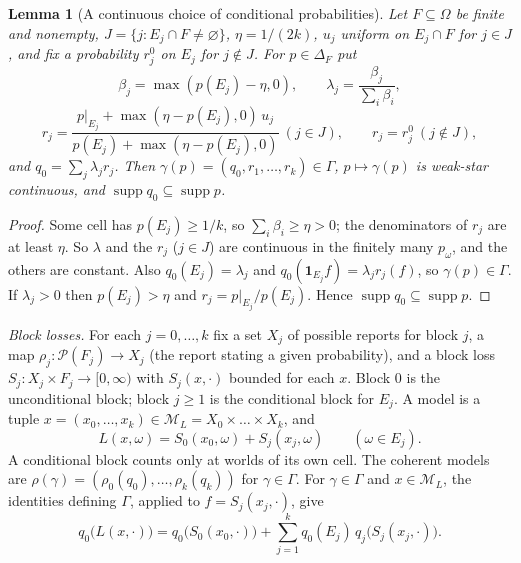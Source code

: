 \documentclass[11pt]{article}
\newtheorem{lemma}[theorem]{Lemma}
\theoremstyle{definition}
\theoremstyle{remark}
\newcommand{\M}{\mathcal M}
\newcommand{\PP}{\mathcal P}
\newcommand{\one}{\mathbf 1}
\newcommand{\supp}{\operatorname{supp}}
\begin{document}
\begin{lemma}[A continuous choice of conditional probabilities]\label{lem:section}
Let $F\subseteq\Omega$ be finite and nonempty, $J=\{j:E_j\cap F\ne\varnothing\}$, $\eta=1/(2k)$, $u_j$ uniform on $E_j\cap F$ for $j\in J$, and fix a probability $r_j^0$ on $E_j$ for $j\notin J$. For $p\in\Delta_F$ put
\[
\beta_j=\max(p(E_j)-\eta,0),\qquad \lambda_j=\frac{\beta_j}{\sum_i\beta_i},
\]
\[
r_j=\frac{p|_{E_j}+\max(\eta-p(E_j),0)\,u_j}{p(E_j)+\max(\eta-p(E_j),0)}\ (j\in J),\qquad r_j=r_j^0\ (j\notin J),
\]
and $q_0=\sum_j\lambda_jr_j$. Then $\gamma(p)=(q_0,r_1,\dots,r_k)\in\Gamma$, $p\mapsto\gamma(p)$ is weak-star continuous, and $\supp q_0\subseteq\supp p$.
\end{lemma}
\begin{proof}
Some cell has $p(E_j)\ge1/k$, so $\sum_i\beta_i\ge\eta>0$; the denominators of $r_j$ are at least $\eta$. So $\lambda$ and the $r_j$ ($j\in J$) are continuous in the finitely many $p_\omega$, and the others are constant. Also $q_0(E_j)=\lambda_j$ and $q_0(\one_{E_j}f)=\lambda_jr_j(f)$, so $\gamma(p)\in\Gamma$. If $\lambda_j>0$ then $p(E_j)>\eta$ and $r_j=p|_{E_j}/p(E_j)$. Hence $\supp q_0\subseteq\supp p$.
\end{proof}

\emph{Block losses.} For each $j=0,\dots,k$ fix a set $X_j$ of possible reports for block $j$, a map $\rho_j:\PP(F_j)\to X_j$ (the report stating a given probability), and a block loss $S_j:X_j\times F_j\to[0,\infty)$ with $S_j(x,\cdot)$ bounded for each $x$. Block $0$ is the unconditional block; block $j\ge1$ is the conditional block for $E_j$. A model is a tuple $x=(x_0,\dots,x_k)\in\M_L=X_0\times\dots\times X_k$, and
\[
 L(x,\omega)=S_0(x_0,\omega)+S_j(x_j,\omega)\qquad(\omega\in E_j).
\]
A conditional block counts only at worlds of its own cell. The coherent models are $\rho(\gamma)=(\rho_0(q_0),\dots,\rho_k(q_k))$ for $\gamma\in\Gamma$. For $\gamma\in\Gamma$ and $x\in\M_L$, the identities defining $\Gamma$, applied to $f=S_j(x_j,\cdot)$, give
\begin{equation}\label{eq:blocks}
 q_0\bigl(L(x,\cdot)\bigr)=q_0\bigl(S_0(x_0,\cdot)\bigr)+\sum_{j=1}^kq_0(E_j)\,q_j\bigl(S_j(x_j,\cdot)\bigr).
\end{equation}
\end{document}
